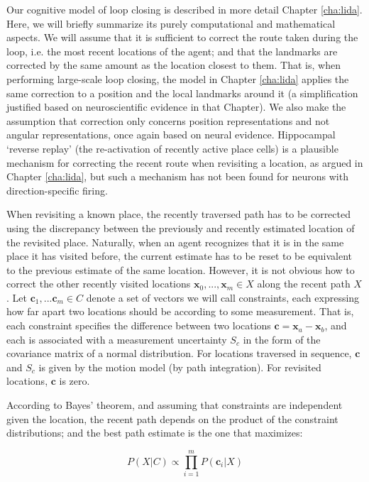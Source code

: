 Our cognitive model of loop closing is described in more detail Chapter \ref{cha:lida}. Here, we will briefly summarize its purely computational and mathematical aspects. We will assume that it is sufficient to correct the route taken during the loop, i.e. the most recent locations of the agent; and that the landmarks are corrected by the same amount as the location closest to them. That is, when performing large-scale loop closing, the model in Chapter \ref{cha:lida} applies the same correction to a position and the local landmarks around it (a simplification justified based on neuroscientific evidence in that Chapter). We also make the assumption that correction only concerns position representations and not angular representations, once again based on neural evidence. Hippocampal `reverse replay' \citep{carr2011hippocampal} (the re-activation of recently active place cells) is a plausible mechanism for correcting the recent route when revisiting a location, as argued in Chapter \ref{cha:lida}, but such a mechanism has not been found for neurons with direction-specific firing.

When revisiting a known place, the recently traversed path has to be corrected using the discrepancy between the previously and recently estimated location of the revisited place. Naturally, when an agent recognizes that it is in the same place it has visited before, the current estimate has to be reset to be equivalent to the previous estimate of the same location. However, it is not obvious how to correct the other recently visited locations $\bm x_0, ..., \bm x_m \in X$ along the recent path $X$. Let $\bm c_1, ... \bm c_m \in C$ denote a set of vectors we will call constraints, each expressing how far apart two locations should be according to some measurement. That is, each constraint specifies the difference between two locations $\bm c=\bm x_a-\bm x_b$, and each is associated with a measurement uncertainty $S_c$ in the form of the covariance matrix of a normal distribution. For locations traversed in sequence, $\bm c$ and $S_c$ is given by the motion model (by path integration). For revisited locations, $\bm c$ is zero. 

According to Bayes' theorem, and assuming that constraints are independent given the location, the recent path depends on the product of the constraint distributions; and the best path estimate is the one that maximizes:

\begin{equation}
\label{loopprob}
P(X|C) \propto \prod_{i=1}^{m} P(\bm c_i|X) 
\end{equation}

